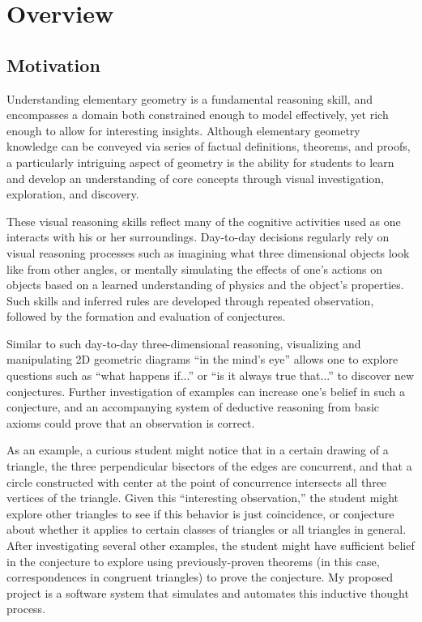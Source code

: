 \chapter{Overview}

\section{Motivation}
Understanding elementary geometry is a fundamental reasoning skill,
and encompasses a domain both constrained enough to model effectively,
yet rich enough to allow for interesting insights.  Although
elementary geometry knowledge can be conveyed via series of factual
definitions, theorems, and proofs, a particularly intriguing aspect of
geometry is the ability for students to learn and develop an
understanding of core concepts through visual investigation,
exploration, and discovery.

These visual reasoning skills reflect many of the cognitive activities
used as one interacts with his or her surroundings.  Day-to-day
decisions regularly rely on visual reasoning processes such as
imagining what three dimensional objects look like from other angles,
or mentally simulating the effects of one's actions on objects based
on a learned understanding of physics and the object's properties.
Such skills and inferred rules are developed through repeated
observation, followed by the formation and evaluation of conjectures.

Similar to such day-to-day three-dimensional reasoning, visualizing
and manipulating 2D geometric diagrams ``in the mind's eye'' allows
one to explore questions such as ``what happens if...''  or ``is it
always true that...''  to discover new conjectures.  Further
investigation of examples can increase one's belief in such a
conjecture, and an accompanying system of deductive reasoning from
basic axioms could prove that an observation is correct.

As an example, a curious student might notice that in a certain
drawing of a triangle, the three perpendicular bisectors of the edges
are concurrent, and that a circle constructed with center at the point
of concurrence intersects all three vertices of the triangle.  Given
this ``interesting observation,'' the student might explore other
triangles to see if this behavior is just coincidence, or conjecture
about whether it applies to certain classes of triangles or all
triangles in general.  After investigating several other examples, the
student might have sufficient belief in the conjecture to explore
using previously-proven theorems (in this case, correspondences in
congruent triangles) to prove the conjecture.  My proposed project is
a software system that simulates and automates this inductive thought
process.

